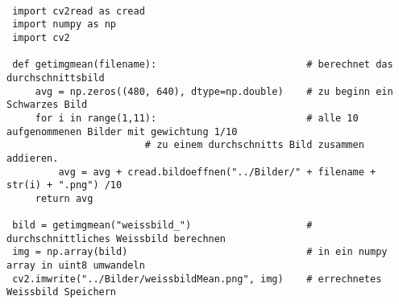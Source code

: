 \begin{lstlisting}[style=PYTHON,frame=single,
 caption=Berechnen von dem Dunkelbild und Weißbild,
 captionpos=b,
 label=lst:Dunkelbild]
 
 import cv2read as cread
 import numpy as np
 import cv2

 def getimgmean(filename):							# berechnet das durchschnittsbild
     avg = np.zeros((480, 640), dtype=np.double)	# zu beginn ein Schwarzes Bild
     for i in range(1,11):							# alle 10 aufgenommenen Bilder mit gewichtung 1/10
 						# zu einem durchschnitts Bild zusammen addieren.
         avg = avg + cread.bildoeffnen("../Bilder/" + filename + str(i) + ".png") /10
     return avg
 
 bild = getimgmean("weissbild_")					# durchschnittliches Weissbild berechnen
 img = np.array(bild)								# in ein numpy array in uint8 umwandeln
 cv2.imwrite("../Bilder/weissbildMean.png", img)	# errechnetes Weissbild Speichern
 
 \end{lstlisting}